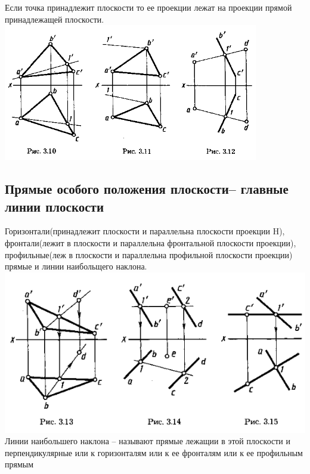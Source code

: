 \documentclass[a4paper, 12pt]{article}
\begin{document}
Если точка принадлежит плоскости то ее проекции лежат на проекции прямой принадлежащей плоскости.\\
\includegraphics{img/321.png}\\


\subsection{Прямые особого положения плоскости-- главные линии плоскости}

Горизонтали(принадлежит плоскости и параллельна плоскости проекции H), фронтали(лежит в плоскости и параллельна фронтальной плоскости проекции), профильные(леж в плоскости и параллельна профильной плоскости проекции) прямые и линии наибольщего наклона.\\

\includegraphics{img/331.png}\\
Линии наибольшего наклона  -- называют прямые лежащии в этой плоскости и перпендикулярные или к горизонталям или к ее фронталям или к ее профильным прямым\\
\end{document}
